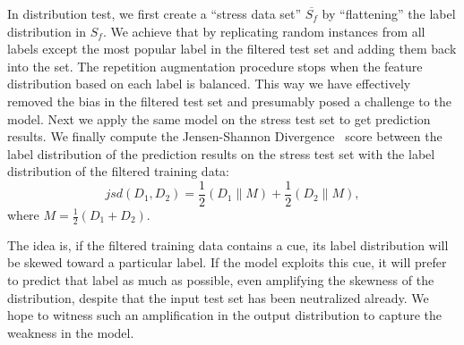 In distribution test, we first create a ``stress data set'' $\overline{S_f}$
by ``flattening'' the label distribution in $S_f$.  
We achieve that by replicating random instances from all labels 
except the most popular label in the filtered test
set and adding them back into the set. 
The repetition augmentation procedure stops when 
the feature distribution based on each label is balanced.
This way we have effectively removed the bias 
in the filtered test set and presumably 
posed a challenge to the model. 
Next we apply the same model on the stress test set 
to get prediction results. 
We finally compute the Jensen-Shannon Divergence~\cite{lin1991divergence} score 
between the label distribution of the prediction results on 
the stress test set with the label distribution of 
the filtered training data:
\begin{equation}
jsd(D_1, D_2) = \frac{1}{2}\left (D_1\parallel M  \right )+\frac{1}{2}\left (D_2\parallel M  \right ),
\end{equation}
where $M= \frac{1}{2}\left (D_1+D_2 \right )$.

The idea is, if the filtered training data contains a cue, 
its label distribution will be skewed toward a particular label.
If the model exploits this cue, it will prefer to predict
that label as much as possible, even amplifying the skewness
of the distribution, despite that the input test set has been
neutralized already. We hope to witness such an amplification
in the output distribution to capture
the weakness in the model.



